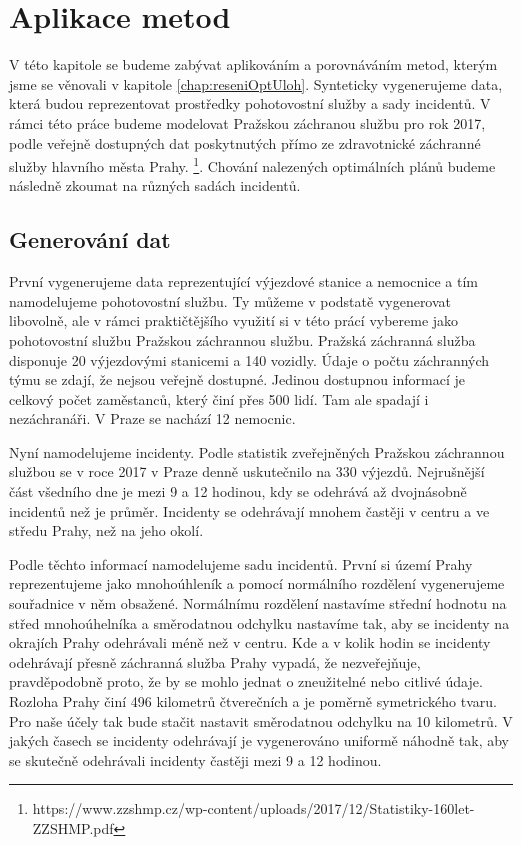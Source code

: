 \chapter{Aplikace metod}

V této kapitole se budeme zabývat aplikováním a porovnáváním metod, kterým jsme se věnovali v kapitole \ref{chap:reseniOptUloh}.
Synteticky vygenerujeme data, která budou reprezentovat prostředky pohotovostní služby a sady incidentů. 
V rámci této práce budeme modelovat Pražskou záchranou službu pro rok 2017, podle veřejně dostupných dat
poskytnutých přímo ze zdravotnické záchranné služby hlavního města Prahy.
\footnote{https://www.zzshmp.cz/wp-content/uploads/2017/12/Statistiky-160let-ZZSHMP.pdf}.
Chování nalezených optimálních plánů budeme následně zkoumat na různých sadách incidentů.

\section{Generování dat}

První vygenerujeme data reprezentující výjezdové stanice a nemocnice a tím namodelujeme pohotovostní službu.
Ty můžeme v podstatě vygenerovat libovolně, ale v rámci praktičtějšího využití
si v této prácí vybereme jako pohotovostní službu Pražskou záchrannou službu.
Pražská záchranná služba disponuje 20 výjezdovými stanicemi a 140 vozidly.
Údaje o počtu záchranných týmu se zdají, že nejsou veřejně dostupné. Jedinou dostupnou informací je celkový počet zaměstanců, který činí přes 500 lidí.
Tam ale spadají i nezáchranáři.
V Praze se nachází 12 nemocnic.

Nyní namodelujeme incidenty. Podle statistik zveřejněných Pražskou záchrannou službou se v roce 2017 v Praze denně uskutečnilo na 330 výjezdů.
Nejrušnější část všedního dne je mezi 9 a 12 hodinou, kdy se odehrává až dvojnásobně incidentů než je průměr.
Incidenty se odehrávají mnohem častěji v centru a ve středu Prahy, než na jeho okolí. 

Podle těchto informací namodelujeme sadu incidentů.
První si území Prahy reprezentujeme jako mnohoúhleník a pomocí normálního rozdělení vygenerujeme souřadnice v něm obsažené.
Normálnímu rozdělení nastavíme střední hodnotu na střed mnohoúhelníka a směrodatnou odchylku nastavíme tak, aby se incidenty na okrajích Prahy odehrávali méně než v centru. 
Kde a v kolik hodin se incidenty odehrávají přesně záchranná služba Prahy vypadá, že nezveřejňuje, pravděpodobně proto, že by se mohlo jednat o zneužitelné nebo citlivé údaje.
Rozloha Prahy činí 496 kilometrů čtverečních a je poměrně symetrického tvaru. Pro naše účely tak bude stačit nastavit směrodatnou odchylku na 10 kilometrů.
V jakých časech se incidenty odehrávají je vygenerováno uniformě náhodně tak, aby se skutečně odehrávali incidenty častěji mezi 9 a 12 hodinou.

